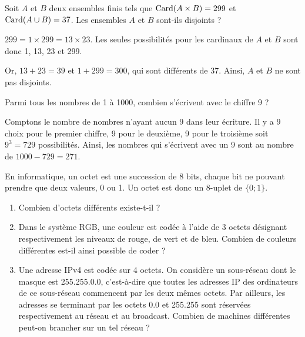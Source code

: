 \documentclass[11pt,fleqn, openany]{book} %
\begin{document}
\begin{exercise}[topic=comb01]
Soit $A$ et $B$ deux ensembles finis tels que $\mathrm{Card}(A \times B)=299$ et 
$\mathrm{Card}(A \cup B)=37$. Les ensembles $A$ et $B$ sont-ils disjoints ?\end{exercise}

\begin{solution}$299 = 1 \times 299 = 13 \times 23$. Les seules possibilités pour les cardinaux de $A$ et $B$ sont donc 1, 13, 23 et 299.

 Or, $13+23=39$ et $1+299=300$, qui sont différents de 37. Ainsi, $A$ et $B$ ne sont pas disjoints.
\end{solution}



\begin{exercise}[topic=comb01]Parmi tous les nombres de 1 à 1000, combien s'écrivent avec le chiffre 9 ?\end{exercise}

\begin{solution}Comptons le nombre de nombres n'ayant aucun 9 dans leur écriture. Il y a 9 choix pour le premier chiffre, 9 pour le deuxième, 9 pour le troisième soit $9^3=729$ possibilités. Ainsi, les nombres qui s'écrivent avec un 9 sont au nombre de $1000-729=271$.\newpage \end{solution}




\begin{exercise}[topic=comb01]En informatique, un octet est une succession de 8 bits, chaque bit ne pouvant prendre que deux valeurs, 0 ou 1. Un octet est donc un 8-uplet de  $\{0;1\}$.
\begin{enumerate}
\item Combien d'octets différents existe-t-il ?
\item Dans le système RGB, une couleur est codée à l'aide de 3 octets désignant respectivement les niveaux de rouge, de vert et de bleu. Combien de couleurs différentes est-il ainsi possible de coder ?
\item Une adresse IPv4 est codée sur 4 octets. On considère un sous-réseau dont le masque est 255.255.0.0, c'est-à-dire que toutes les adresses IP des ordinateurs de ce sous-réseau commencent par les deux mêmes octets. Par ailleurs, les adresses se terminant par les octets 0.0 et 255.255 sont réservées respectivement au réseau et au broadcast. Combien de machines différentes peut-on brancher sur un tel réseau ?
\end{enumerate}\end{exercise}
\end{document}

